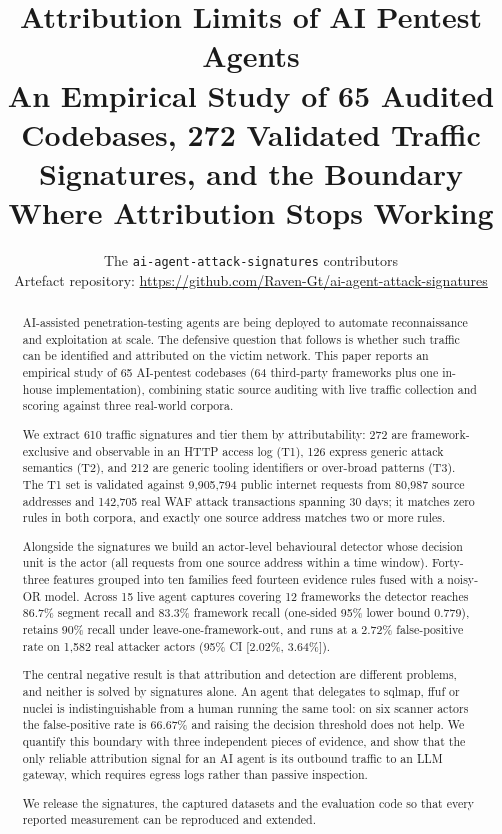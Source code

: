 \documentclass[11pt]{article}
\title{\textbf{Attribution Limits of AI Pentest Agents}\\
An Empirical Study of 65 Audited Codebases, 272 Validated Traffic
Signatures, and the Boundary Where Attribution Stops Working}
\author{The \texttt{ai-agent-attack-signatures} contributors\\
\small Artefact repository: \url{https://github.com/Raven-Gt/ai-agent-attack-signatures}}
\date{}
\begin{document}
\maketitle
\thispagestyle{plain}

\begin{abstract}
AI-assisted penetration-testing agents are being deployed to automate reconnaissance and
exploitation at scale. The defensive question that follows is whether such traffic can be
identified and attributed on the victim network. This paper reports an empirical study of
65 AI-pentest codebases (64 third-party frameworks plus one in-house implementation),
combining static source auditing with live traffic collection and scoring against three
real-world corpora.

We extract 610 traffic signatures and tier them by attributability: 272 are framework-exclusive
and observable in an HTTP access log (T1), 126 express generic attack semantics (T2), and 212
are generic tooling identifiers or over-broad patterns (T3). The T1 set is validated against
9,905,794 public internet requests from 80,987 source addresses and 142,705 real WAF attack
transactions spanning 30 days; it matches zero rules in both corpora, and exactly one source
address matches two or more rules.

Alongside the signatures we build an actor-level behavioural detector whose decision unit is
the actor (all requests from one source address within a time window). Forty-three features
grouped into ten families feed fourteen evidence rules fused with a noisy-OR model. Across 15
live agent captures covering 12 frameworks the detector reaches 86.7\% segment recall and 83.3\%
framework recall (one-sided 95\% lower bound 0.779), retains 90\% recall under
leave-one-framework-out, and runs at a 2.72\% false-positive rate on 1,582 real attacker actors
(95\% CI [2.02\%, 3.64\%]).

The central negative result is that attribution and detection are different problems, and
neither is solved by signatures alone. An agent that delegates to sqlmap, ffuf or nuclei is
indistinguishable from a human running the same tool: on six scanner actors the false-positive
rate is 66.67\% and raising the decision threshold does not help. We quantify this boundary
with three independent pieces of evidence, and show that the only reliable attribution signal
for an AI agent is its outbound traffic to an LLM gateway, which requires egress logs rather
than passive inspection.

We release the signatures, the captured datasets and the evaluation code so that every
reported measurement can be reproduced and extended.
\end{abstract}
\end{document}
